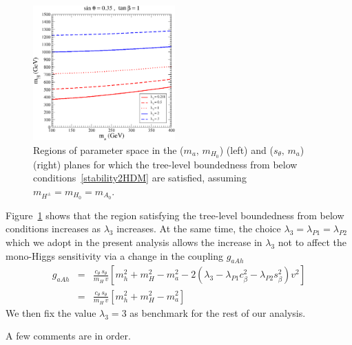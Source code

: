 \begin{itemize}
\begin{figure}[h!]
\begin{center}
\includegraphics[width=0.485\textwidth]{texinputs/03_theoparameters/Figs/Plot_ma.pdf}
\caption{\small Regions of parameter space in the 
    ($m_a,\, m_{H_0}$) (left) and ($s_{\theta},\, m_a$) (right) planes for which the tree-level boundedness from below conditions~\ref{stability2HDM}
    are satisfied, assuming $m_{H^{\pm}} = m_{H_0} = m_{A_0}$. 
}
\label{Fig_Stability}
\end{center}

\vspace{-2mm}

\end{figure}
    
    Figure~\ref{Fig_Stability} shows that the region satisfying the tree-level boundedness from below conditions increases as $\lambda_3$ increases. At the same time, 
    the choice $\lambda_3 = \lambda_{P1} = \lambda_{P2}$ which we adopt in the present analysis allows the increase in $\lambda_3$  not to affect the mono-Higgs sensitivity
    via a change in the coupling $g_{aAh}$
    \begin{eqnarray}
     g_{aAh} &=& \frac{c_{\theta} \,s_{\theta}}{m_{H} \,v} \left[m_h^2 + m_H^2 -m_a^2 - 2 
     (\lambda_3 - \lambda_{P1} c_{\beta}^2 - \lambda_{P2} s_{\beta}^2) v^2 \right] \nonumber \\
      &=& \frac{c_{\theta} \,s_{\theta}}{m_{H} \,v} \left[m_h^2 + m_H^2 -m_a^2 \right] 
    \end{eqnarray}
    We then fix the value $\lambda_3 = 3$ as benchmark for the rest of our analysis. 
    
    \vspace{3mm}
    
    A few comments are in order. 
    

\end{itemize}
